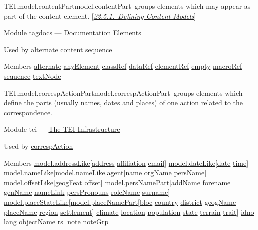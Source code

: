 \begin{reflist}
\item[]\begin{specHead}{TEI.model.contentPart}{model.contentPart} groups elements which may appear as part of the content element. [\textit{\hyperref[DEFCON]{22.5.1.\ Defining Content Models}}]\end{specHead} 
    \item[{Module}]
  tagdocs — \hyperref[TD]{Documentation Elements}
    \item[{Used by}]
  \hyperref[TEI.alternate]{alternate} \hyperref[TEI.content]{content} \hyperref[TEI.sequence]{sequence}
    \item[{Members}]
  \hyperref[TEI.alternate]{alternate} \hyperref[TEI.anyElement]{anyElement} \hyperref[TEI.classRef]{classRef} \hyperref[TEI.dataRef]{dataRef} \hyperref[TEI.elementRef]{elementRef} \hyperref[TEI.empty]{empty} \hyperref[TEI.macroRef]{macroRef} \hyperref[TEI.sequence]{sequence} \hyperref[TEI.textNode]{textNode}
\end{reflist}  
\begin{reflist}
\item[]\begin{specHead}{TEI.model.correspActionPart}{model.correspActionPart} groups elements which define the parts (usually names, dates and places) of one action related to the correspondence.\end{specHead} 
    \item[{Module}]
  tei — \hyperref[ST]{The TEI Infrastructure}
    \item[{Used by}]
  \hyperref[TEI.correspAction]{correspAction}
    \item[{Members}]
  \hyperref[TEI.model.addressLike]{model.addressLike}[\hyperref[TEI.address]{address} \hyperref[TEI.affiliation]{affiliation} \hyperref[TEI.email]{email}] \hyperref[TEI.model.dateLike]{model.dateLike}[\hyperref[TEI.date]{date} \hyperref[TEI.time]{time}] \hyperref[TEI.model.nameLike]{model.nameLike}[\hyperref[TEI.model.nameLike.agent]{model.nameLike.agent}[\hyperref[TEI.name]{name} \hyperref[TEI.orgName]{orgName} \hyperref[TEI.persName]{persName}] \hyperref[TEI.model.offsetLike]{model.offsetLike}[\hyperref[TEI.geogFeat]{geogFeat} \hyperref[TEI.offset]{offset}] \hyperref[TEI.model.persNamePart]{model.persNamePart}[\hyperref[TEI.addName]{addName} \hyperref[TEI.forename]{forename} \hyperref[TEI.genName]{genName} \hyperref[TEI.nameLink]{nameLink} \hyperref[TEI.persPronouns]{persPronouns} \hyperref[TEI.roleName]{roleName} \hyperref[TEI.surname]{surname}] \hyperref[TEI.model.placeStateLike]{model.placeStateLike}[\hyperref[TEI.model.placeNamePart]{model.placeNamePart}[\hyperref[TEI.bloc]{bloc} \hyperref[TEI.country]{country} \hyperref[TEI.district]{district} \hyperref[TEI.geogName]{geogName} \hyperref[TEI.placeName]{placeName} \hyperref[TEI.region]{region} \hyperref[TEI.settlement]{settlement}] \hyperref[TEI.climate]{climate} \hyperref[TEI.location]{location} \hyperref[TEI.population]{population} \hyperref[TEI.state]{state} \hyperref[TEI.terrain]{terrain} \hyperref[TEI.trait]{trait}] \hyperref[TEI.idno]{idno} \hyperref[TEI.lang]{lang} \hyperref[TEI.objectName]{objectName} \hyperref[TEI.rs]{rs}] \hyperref[TEI.note]{note} \hyperref[TEI.noteGrp]{noteGrp}
\end{reflist}  
